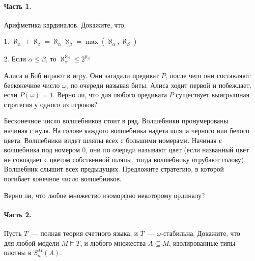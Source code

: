 \setcounter{curtask}{1}

\mytitle{}

\paragraph{Часть 1.}


\begin{task}
    Арифметика кардиналов. Докажите, что:
    
    1. $\aleph_{\alpha} + \aleph_{\beta} = \aleph_{\alpha}  \aleph_{\beta} =
    	\max(\aleph_{\alpha}, \aleph_{\beta})$
     
    2. Если $\alpha \le \beta$, то $\aleph_{\alpha}^{\aleph_{\beta}} \le 2^{\aleph_{\beta}}$
\end{task}

\begin{task}
	Алиса и Боб играют в игру. Они загадали предикат $P$, после чего они составляют
    бесконечное число $\omega$, по очереди называя биты. Алиса ходит первой и
    побеждает, если $P(\omega) = 1$. Верно ли, что для любого предиката $P$
    существует выигрышная стратегия у одного из игроков?
\end{task}

\begin{task}
    Бесконечное число волшебников стоит в ряд. Волшебники пронумерованы начиная с
    нуля. На голове каждого волшебника надета шляпа черного или белого
    цвета. Волшебники видят шляпы всех с большими номерами. Начиная с волшебника под
    номером $0$, они по очереди называют цвет (если названный цвет не совпадает с
    цветом собственной шляпы, тогда волшебнику отрубают голову). Волшебник слышит
    всех предыдущих. Предложите стратегию, в которой погибает конечное число
    волшебников.
\end{task}

\begin{task}
    Верно ли, что любое множество изоморфно некоторому ординалу?
\end{task}

\breakline

\paragraph{Часть 2.}

\begin{task}
    Пусть $T$~--- полная теория счетного языка, и $T$~---
    $\omega$-стабильна. Докажите, что для любой модели $M \models T$, и любого
    множества $A \subseteq M$, изолированные типы плотны в $S_n^M(A)$. 
\end{task}

